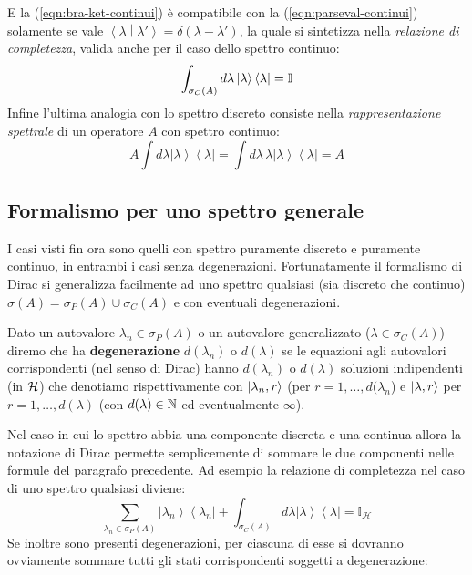 \documentclass[../../FisicaTeorica.tex]{subfiles}
\begin{document}
E la (\ref{eqn:bra-ket-continui}) è compatibile con la (\ref{eqn:parseval-continui}) solamente se vale $\left\langle\lambda\middle|\lambda'\right\rangle= \delta \left(\lambda-\lambda'\right)$, la quale si sintetizza nella \textit{relazione di completezza}, valida anche per il caso dello spettro continuo:
\[
\int_{\sigma_{C}\left(A\right)}{d\lambda\left|\lambda\right\rangle\left\langle\lambda\right|}=\mathbb{I}
\]
Infine l'ultima analogia con lo spettro discreto consiste nella \emph{rappresentazione spettrale} di un operatore $A$ con spettro continuo:
\[
A\int d\lambda  \left|\lambda\right\rangle\left\langle\lambda\right|=\int d\lambda\,\lambda \left|\lambda\right\rangle\left\langle\lambda\right|=A 
\]

\subsection{Formalismo per uno spettro generale}
I casi visti fin ora sono quelli con spettro puramente discreto e puramente continuo, in entrambi i casi senza degenerazioni. Fortunatamente il formalismo di Dirac si generalizza facilmente ad uno spettro qualsiasi (sia discreto che continuo) $\sigma \left(A\right)= \sigma_P(A)\cup \sigma_C\left(A\right)$ e con eventuali degenerazioni.\\
\begin{dfn}[degenerazione]
Dato un autovalore $\lambda_n\in \sigma_P(A)$ o un autovalore generalizzato ($\lambda \in \sigma_C(A)$) diremo che ha \textbf{degenerazione} $d(\lambda_n)$ o $d\left(\lambda\right)$ se le equazioni agli autovalori corrispondenti (nel senso di Dirac) hanno $d\left(\lambda_n\right)$ o $d\left(\lambda\right)$ soluzioni indipendenti (in $\mathcal{H}$) che denotiamo rispettivamente con $\ket{\lambda_{n}, r}$ (per $r=1,\dots, d(\lambda_n$) e $\ket{\lambda, r}$ per $r = 1,\dots, d(\lambda)$ (con $d(\lambda) \in \mathbb{N}$ ed eventualmente $\infty$).
\end{dfn}
Nel caso in cui lo spettro abbia una componente discreta e una continua allora la notazione di Dirac permette semplicemente di sommare le due componenti nelle formule del paragrafo precedente.
Ad esempio la relazione di completezza nel caso di uno spettro qualsiasi diviene:
\[
\sum_{\lambda_n\in\sigma_P\left(A\right)}{\left|\lambda_n\right\rangle\left\langle\lambda_n\right|+\int_{\sigma_C\left(A\right)} d\lambda\left|\lambda\right\rangle\left\langle\lambda\right|=\mathbb{I}_\mathcal{H}}
\]
Se inoltre sono presenti degenerazioni, per ciascuna di esse si dovranno ovviamente sommare tutti gli stati corrispondenti soggetti a degenerazione:
\end{document}
